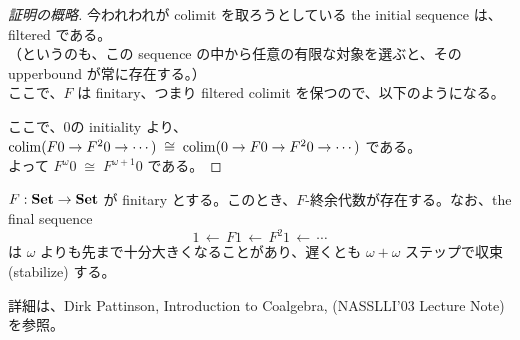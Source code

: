 \documentclass[
		head_space=20mm,
		foot_space=20mm,
		gutter=10mm,
		line_length=190mm
]{jlreq}
\begin{document}
\begin{proof}[証明の概略]
	今われわれが colimit を取ろうとしている the initial sequence は、filtered である。 \\（というのも、この sequence の中から任意の有限な対象を選ぶと、その upperbound が常に存在する。）\\ ここで、$F$ は finitary、つまり filtered colimit を保つので、以下のようになる。 
	\begin{center}\small
	\end{center}
	ここで、$0$の initiality より、$\operatorname*{colim}(F0\to F^20\to\cdots)\;\cong\;\operatorname*{colim}(0\to F0\to F^20\to\cdots)$ である。\\よって $F^\omega 0\;\cong\;F^{\omega+1}0$ である。
\end{proof}

\begin{theorem}
	$F:\mathbf{Set}\to\mathbf{Set}$ が finitary とする。このとき、$F$-終余代数が存在する。なお、the final sequence 
	\[1 \,\longleftarrow\, F1 \,\longleftarrow\, F^2 1 \,\longleftarrow\,\cdots\]
	は $\omega$ よりも先まで十分大きくなることがあり、遅くとも $\omega+\omega$ ステップで収束 (stabilize) する。
\end{theorem}

\begin{supplement}
	詳細は、Dirk Pattinson, Introduction to Coalgebra, (NASSLLI'03 Lecture Note) を参照。
\end{supplement}



\end{document}
